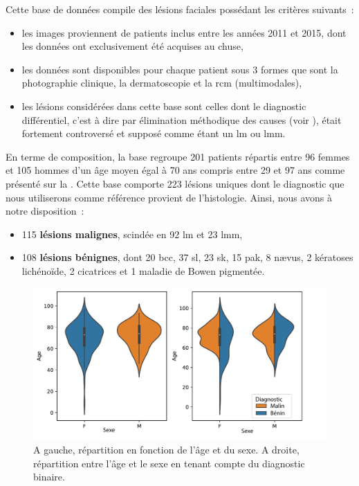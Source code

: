 Cette base de données compile des lésions faciales possédant les critères suivants~:
\begin{itemize}
    \item les images proviennent de patients inclus entre les années 2011 et 2015, dont les données ont exclusivement été acquises au \gls{chuse},
    \item les données sont disponibles pour chaque patient sous 3 formes que sont la photographie clinique, la dermatoscopie et la \gls{rcm} (multimodales),
    \item les lésions considérées dans cette base sont celles dont le diagnostic différentiel, c'est à dire par élimination méthodique des causes (voir
    ), était fortement controversé et supposé comme étant un \gls{lm} ou \gls{lmm}.
\end{itemize}\par

En terme de composition, la base regroupe 201 patients répartis entre 96 femmes et 105 hommes d'un âge moyen égal à 70 ans compris entre 29 et 97 ans comme présenté sur la . Cette base comporte 223 lésions uniques dont le diagnostic que nous utiliserons comme référence provient de l'histologie. Ainsi, nous avons à notre disposition~:
\begin{itemize}
    \item 115 \textbf{lésions malignes}, scindée en 92 \gls{lm} et 23 \gls{lmm},
    \item 108 \textbf{lésions bénignes}, dont 20 \gls{bcc}, 37 \gls{sl}, 23 \gls{sk}, 15 \gls{pak}, 8 nævus, 2 kératoses lichénoïde, 2 cicatrices et 1 maladie de Bowen pigmentée.
\end{itemize}\par

\begin{figure}[H]
    \centering
    \includegraphics[width=0.8\linewidth]{contents/chapter_3_1/resources/statistics_age_sex.pdf}
    \caption{A gauche, répartition en fonction de l'âge et du sexe. A droite, répartition entre l'âge et le sexe en tenant compte du diagnostic binaire.}
    \label{fig:statistics_age_sex}
\end{figure}\par

